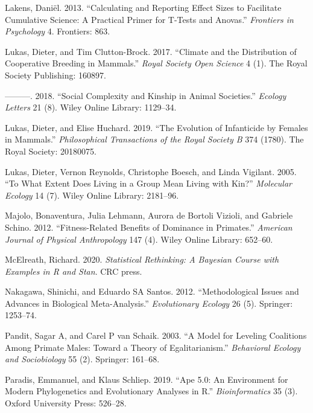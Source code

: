 \documentclass[]{article}
\begin{document}
\leavevmode\hypertarget{ref-lakens2013calculating}{}%
Lakens, Daniël. 2013. ``Calculating and Reporting Effect Sizes to
Facilitate Cumulative Science: A Practical Primer for T-Tests and
Anovas.'' \emph{Frontiers in Psychology} 4. Frontiers: 863.

\leavevmode\hypertarget{ref-lukas2017climate}{}%
Lukas, Dieter, and Tim Clutton-Brock. 2017. ``Climate and the
Distribution of Cooperative Breeding in Mammals.'' \emph{Royal Society
Open Science} 4 (1). The Royal Society Publishing: 160897.

\leavevmode\hypertarget{ref-lukas2018social}{}%
---------. 2018. ``Social Complexity and Kinship in Animal Societies.''
\emph{Ecology Letters} 21 (8). Wiley Online Library: 1129--34.

\leavevmode\hypertarget{ref-lukas2019evolution}{}%
Lukas, Dieter, and Elise Huchard. 2019. ``The Evolution of Infanticide
by Females in Mammals.'' \emph{Philosophical Transactions of the Royal
Society B} 374 (1780). The Royal Society: 20180075.

\leavevmode\hypertarget{ref-lukas2005extent}{}%
Lukas, Dieter, Vernon Reynolds, Christophe Boesch, and Linda Vigilant.
2005. ``To What Extent Does Living in a Group Mean Living with Kin?''
\emph{Molecular Ecology} 14 (7). Wiley Online Library: 2181--96.

\leavevmode\hypertarget{ref-majolo2012fitness}{}%
Majolo, Bonaventura, Julia Lehmann, Aurora de Bortoli Vizioli, and
Gabriele Schino. 2012. ``Fitness-Related Benefits of Dominance in
Primates.'' \emph{American Journal of Physical Anthropology} 147 (4).
Wiley Online Library: 652--60.

\leavevmode\hypertarget{ref-mcelreath2020statistical}{}%
McElreath, Richard. 2020. \emph{Statistical Rethinking: A Bayesian
Course with Examples in R and Stan}. CRC press.

\leavevmode\hypertarget{ref-nakagawa2012methodological}{}%
Nakagawa, Shinichi, and Eduardo SA Santos. 2012. ``Methodological Issues
and Advances in Biological Meta-Analysis.'' \emph{Evolutionary Ecology}
26 (5). Springer: 1253--74.

\leavevmode\hypertarget{ref-pandit2003model}{}%
Pandit, Sagar A, and Carel P van Schaik. 2003. ``A Model for Leveling
Coalitions Among Primate Males: Toward a Theory of Egalitarianism.''
\emph{Behavioral Ecology and Sociobiology} 55 (2). Springer: 161--68.

\leavevmode\hypertarget{ref-paradis2019ape}{}%
Paradis, Emmanuel, and Klaus Schliep. 2019. ``Ape 5.0: An Environment
for Modern Phylogenetics and Evolutionary Analyses in R.''
\emph{Bioinformatics} 35 (3). Oxford University Press: 526--28.
\end{document}
